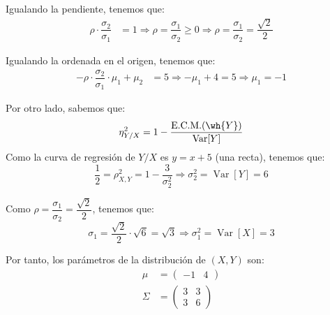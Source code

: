 \documentclass[12pt]{article}
\DeclareMathOperator{\Var}{Var}
\begin{document}
\begin{ejercicio}[2 puntos]
\begin{enumerate}
            Igualando la pendiente, tenemos que:
            \begin{align*}
                \rho\cdot \dfrac{\sigma_2}{\sigma_1} &= 1
                \Longrightarrow
                \rho = \dfrac{\sigma_1}{\sigma_2} \geq 0
                \Longrightarrow
                \rho = \dfrac{\sigma_1}{\sigma_2} = \dfrac{\sqrt{2}}{2}
            \end{align*}

            Igualando la ordenada en el origen, tenemos que:
            \begin{align*}
                -\rho\cdot \dfrac{\sigma_2}{\sigma_1}\cdot\mu_1 + \mu_2 &= 5
                \Longrightarrow
                -\mu_1 + 4 = 5
                \Longrightarrow \mu_1 = -1
            \end{align*}

            Por otro lado, sabemos que:
            \begin{equation*}
                \eta^2_{Y/X} = 1-\frac{\text{E.C.M.}(\wh{Y})}{\Var[Y]}
            \end{equation*}
            Como la curva de regresión de $Y/X$ es $y=x+5$ (una recta), tenemos que:
            \begin{equation*}
                \dfrac{1}{2} = \rho^2_{X,Y} = 1-\frac{3}{\sigma_2^2}
                \Longrightarrow \sigma_2^2 = \Var[Y] = 6
            \end{equation*}

            Como $\rho = \dfrac{\sigma_1}{\sigma_2} = \dfrac{\sqrt{2}}{2}$, tenemos que:
            \begin{equation*}
                \sigma_1 = \dfrac{\sqrt{2}}{2}\cdot \sqrt{6} = \sqrt{3}
                \Longrightarrow
                \sigma_1^2=\Var[X]=3
            \end{equation*}

            Por tanto, los parámetros de la distribución de $(X,Y)$ son:
            \begin{align*}
                \mu &= \begin{pmatrix}
                    -1 & 4
                \end{pmatrix}\\
                \Sigma &= \begin{pmatrix}
                    3 & 3\\
                    3 & 6
                \end{pmatrix}
            \end{align*}


\end{enumerate}
\end{ejercicio}
\end{document}
